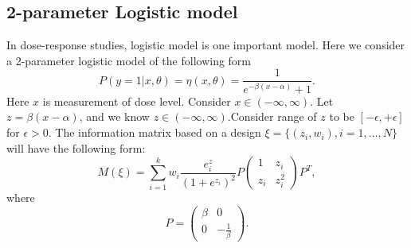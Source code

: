\documentclass[11pt]{amsart}
\theoremstyle{definition}
\theoremstyle{remark}
\begin{document}

 \subsection{2-parameter Logistic model}

In dose-response studies, logistic model is one important model. Here we consider a 2-parameter logistic model of the following form 
\[
P(y=1|x,\theta) = \eta(x,\theta)= \frac{1}{e^{-\beta(x-\alpha)}+1}.
\]
 Here $x$ is measurement of dose level. Consider $x\in (-\infty,\infty)$. Let $z = \beta(x-\alpha)$, and we know $z\in (-\infty,\infty)$.Consider range of $z$ to be $[-\epsilon,+\epsilon]$ for $\epsilon>0$. The information matrix based on a design $\xi = \{(z_i,w_i), i=1,\ldots,N\}$ will have the following form: \begin{equation}
M(\xi) = \sum_{i=1}^{k} w_i \frac{e^z_i}{(1+e^{z_i})^2}P \left( \begin{array}{cc}
1 & z_i\\
z_i & z_i^2
\end{array} \right) P^T,
\end{equation} where \[P = \left( \begin{array}{cc}
\beta & 0\\
0 & -\frac{1}{\beta}
\end{array} \right).\] \\
\end{document}
